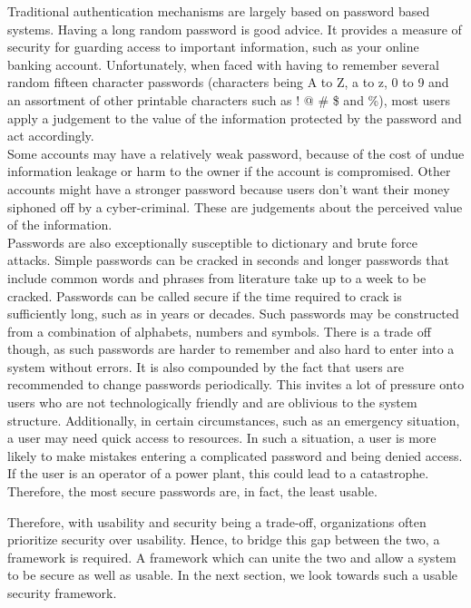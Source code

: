 \smallskip

Traditional authentication mechanisms are largely based on password based systems. Having a long random password is good advice. It provides a measure of security for guarding access to important information, such as your online banking account. 
Unfortunately, when faced with having to remember several random fifteen character passwords (characters being A to Z, a to z, 0 to 9 and an assortment of other printable characters such as ! @ \# \$ and \%), most users apply a judgement to the value of the information protected by the password and act accordingly.\\
Some accounts may have a relatively weak password, because of the cost of undue information leakage or harm to the owner if the account is compromised. Other accounts might have a stronger password because users don't want their money siphoned off by a cyber-criminal. These are judgements about the perceived value of the information. \\
Passwords are also exceptionally susceptible to dictionary and brute force attacks. Simple passwords can be cracked in seconds and longer passwords that include common words and phrases from literature take up to a week to be cracked. Passwords can be called secure if the time required to crack is sufficiently long, such as in years or decades. Such passwords may be constructed from a combination of alphabets, numbers and symbols. There is a trade off though, as such passwords are harder to remember and also hard to enter into a system without errors. It is also compounded by the fact that users are recommended to change passwords periodically. This invites a lot of pressure onto users who are not technologically friendly and are oblivious to the system structure. Additionally, in certain circumstances, such as an emergency situation, a user may need quick access to resources. In such a situation, a user is more likely to make mistakes entering a complicated password and being denied access. If the user is an operator of a power plant, this could lead to a catastrophe. Therefore, the most secure passwords are, in fact, the least usable. 

\smallskip

Therefore, with usability and security being a trade-off, organizations often prioritize security over usability. Hence, to bridge this gap between the two, a framework is required. A framework which can unite the two and allow a system to be secure as well as usable. In the next section, we look towards such a usable security framework.


